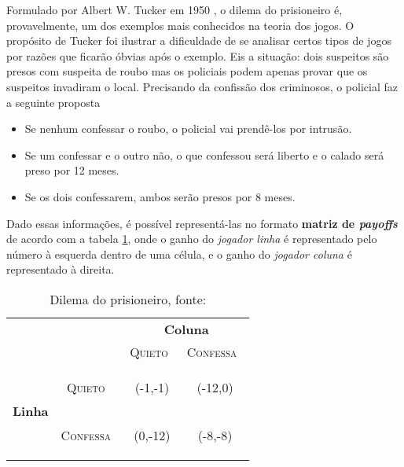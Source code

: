 Formulado por Albert W. Tucker em 1950 \cite{sartini_IIbienaldasbm}, o dilema do prisioneiro é, provavelmente, um dos exemplos mais conhecidos na teoria dos jogos. O propósito de Tucker foi ilustrar a dificuldade de se analisar certos tipos de jogos por razões que ficarão óbvias após o exemplo. Eis a situação: dois suspeitos são presos com suspeita de roubo mas os policiais podem apenas provar que os suspeitos invadiram o local. Precisando da confissão dos criminosos, o policial faz a seguinte proposta
\begin{itemize}
	\tightlist
	\item Se nenhum confessar o roubo, o policial vai prendê-los por intrusão.
	\item Se um confessar e o outro não, o que confessou será liberto e o calado será preso por 12 meses.
	\item Se os dois confessarem, ambos serão presos por 8 meses.
\end{itemize}

Dado essas informações, é possível representá-las no formato {\bfseries matriz de \emph{payoffs}} de acordo com a tabela \ref{tab:dilema-prisioneiro}, onde o ganho do \emph{jogador linha} é representado pelo número à esquerda dentro de uma célula, e o ganho do \emph{jogador coluna} é representado à direita.

\begin{table}[ht]
\centering
\begin{tabular}{|c|c|c|c|}
	\cline{3-4}
	\multicolumn{1}{c}{} &  & \multicolumn{2}{c|}{{\bfseries Coluna}}\tabularnewline
	\cline{3-4}
	\multicolumn{1}{c}{} &  & {\scshape Quieto}\  & {\scshape Confessa}\ \tabularnewline
	\hline
	\multirow{2}{*}{\begin{turn}{90}
	{\bfseries Linha}
	\end{turn}} & \begin{turn}{90}
	{\scshape Quieto}\
	\end{turn} & {\Large(}{\Large -1,}{\Large -1)} & {\Large(}{\Large -12,}{\Large 0)}\tabularnewline
	\cline{2-4}
	 & \begin{turn}{90}
	{\scshape Confessa}\
	\end{turn} & {\Large(}{\Large 0,}{\Large -12)} & {\Large(}{\Large -8,}{\Large -8)}\tabularnewline
	\hline
\end{tabular}
\caption{Dilema do prisioneiro, fonte: \cite{spaniel_2011}}
\label{tab:dilema-prisioneiro}
\end{table}


